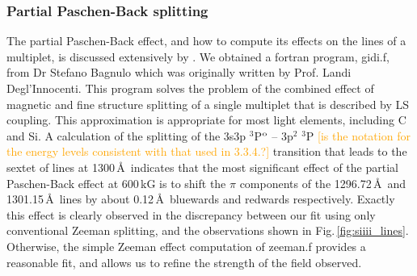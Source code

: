 \documentclass[fleqn,usenatbib]{mnras}
\newcommand{\bs}{\ensuremath{\langle \vert B \vert \rangle}}
\newcommand{\bgc}[1]{\textcolor{orange}{[#1]}}
\begin{document}

\subsubsection{Partial Paschen-Back splitting}

The partial Paschen-Back effect, and how to compute its effects on the lines of a multiplet, is discussed extensively by \citet[][Sec. 3.4]{landideglinnocenti+landolfi04-1}. We obtained a {\sc fortran} program, {\sc gidi.f}, from Dr Stefano Bagnulo which was originally written by Prof. Landi Degl'Innocenti. This program solves the problem of the combined effect of magnetic and fine structure splitting of a single multiplet that is described by LS coupling. This approximation is appropriate for most light elements, including C and Si. A calculation of the splitting of the 3s3p $^3$P$^{\rm o}$ -- 3p$^2$ $^3$P \bgc{is the notation for the energy levels consistent with that used in 3.3.4.?} transition that leads to the sextet of lines at 1300\,\AA\ indicates that the most significant effect of the partial Paschen-Back effect at 600\,kG is to shift the $\pi$ components of the 1296.72\,\AA\ and 1301.15\,\AA\ lines by about 0.12\,\AA\ bluewards and redwards respectively. Exactly this effect is clearly observed in the discrepancy between our fit using only conventional Zeeman splitting, and the observations shown in Fig.\,\ref{fig:siiii_lines}. Otherwise, the simple Zeeman effect computation of {\sc zeeman.f} provides a reasonable fit, and allows us to refine the strength of the field observed.

\end{document}
